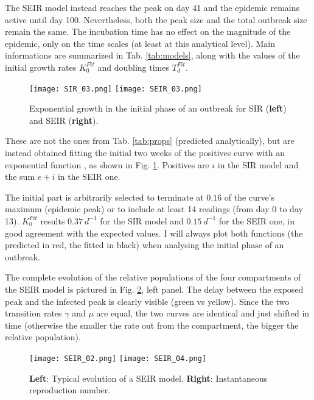 \documentclass[DIV=12, BCOR=0pt]{scrartcl}  %
\begin{document}
	The SEIR model instead reaches the peak on day 41 and the epidemic remains active until day 100. Nevertheless, both the peak size and the total outbreak size remain the same. The incubation time has no effect on the magnitude of the epidemic, only on the time scales (at least at this analytical level). Main informations are summarized in Tab. \ref{tab:models}, along with the values of the initial growth rates $K_0^{Fit}$ and doubling times $T_d^{Fit}$. 
	\begin{figure}[h!]
		\centering
		\texttt{[image: SIR\_03.png]}
		\texttt{[image: SEIR\_03.png]}
		\caption{Exponential growth in the initial phase of an outbreak for SIR (\textbf{left}) and SEIR (\textbf{right}). }
		\label{fig:BothExp}
	\end{figure}

	These are not the ones from Tab. \ref{tab:props} (predicted analytically), but are instead obtained fitting the initial two weeks of the positives curve with an exponential function \citep{Bauch2005}, as shown in Fig. \ref{fig:BothExp}. Positives are $i$ in the SIR model and the sum $e + i$ in the SEIR one.
	 
	The initial part is arbitrarily selected to terminate at $0.16$ of the curve's maximum (epidemic peak) or to include at least 14 readings (from day 0 to day 13). 
	$K_0^{Fit}$ results $0.37 \ d^{-1}$ for the SIR model and  $0.15 \ d^{-1}$ for the SEIR one, in good agreement with the expected values. I will always plot both functions (the predicted in red, the fitted in black) when analysing the initial phase of an outbreak. 
	
	
	The complete evolution of the relative populations of the four compartments of the SEIR model is pictured in Fig. \ref{fig:SEIRboth}, left panel. The delay between the exposed peak and the infected peak is clearly visible (green vs yellow). Since the two transition rates $\gamma$ and $\mu$ are equal, the two curves are identical and just shifted in time (otherwise the smaller the rate out from the compartment, the bigger the relative population).
	\begin{figure}[h]
		\centering
		\texttt{[image: SEIR\_02.png]}
		\texttt{[image: SEIR\_04.png]}
		\caption{\textbf{Left}: Typical evolution of a SEIR model. \textbf{Right}: Instantaneous reproduction number. }
		\label{fig:SEIRboth}
	\end{figure}
\end{document}
